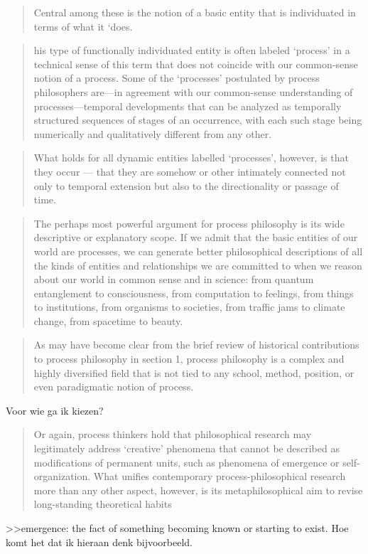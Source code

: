 \documentclass[a4paper]{Thesis}
\begin{document}
\begin{quotation}
	Central among these is the notion of a basic entity that is individuated in terms of what it ‘does.
\end{quotation}

\begin{quotation}
	his type of functionally individuated entity is often labeled ‘process’ in a technical sense of this term that does not coincide with our common-sense notion of a process. Some of the ‘processes’ postulated by process philosophers are—in agreement with our common-sense understanding of processes—temporal developments that can be analyzed as temporally structured sequences of stages of an occurrence, with each such stage being numerically and qualitatively different from any other.
\end{quotation}

\begin{quotation}
	What holds for all dynamic entities labelled ‘processes’, however, is that they occur — that they are somehow or other intimately connected not only to temporal extension but also to the directionality or passage of time.
\end{quotation}

\begin{quotation}
	The perhaps most powerful argument for process philosophy is its wide descriptive or explanatory scope. 
	If we admit that the basic entities of our world are processes, we can generate better philosophical descriptions of all the kinds of entities and relationships we are committed to when we reason about our world in common sense and in science: from quantum entanglement to consciousness, from computation to feelings, from things to institutions, from organisms to societies, from traffic jams to climate change, from spacetime to beauty. 
\end{quotation}

\begin{quotation}
	As may have become clear from the brief review of historical contributions to process philosophy in section 1, process philosophy is a complex and highly diversified field that is not tied to any school, method, position, or even paradigmatic notion of process.
\end{quotation} 
Voor wie ga ik kiezen?

\begin{quotation}
	Or again, process thinkers hold that philosophical research may legitimately address ‘creative’ phenomena that cannot be described as modifications of permanent units, such as phenomena of emergence or self-organization. What unifies contemporary process-philosophical research more than any other aspect, however, is its metaphilosophical aim to revise long-standing theoretical habits
\end{quotation}
>>emergence:  the fact of something becoming known or starting to exist.
Hoe komt het dat ik hieraan denk bijvoorbeeld.
\end{document}
